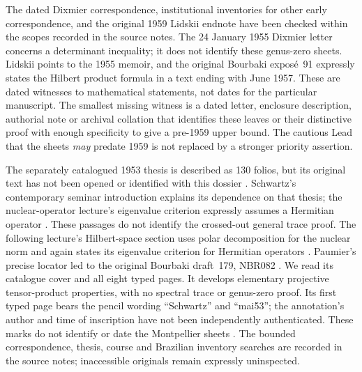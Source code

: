 The dated Dixmier correspondence, institutional inventories for other
early correspondence, and the original 1959 Lidskii endnote have
been checked within the scopes recorded in the source notes. The
24 January 1955 Dixmier letter concerns a determinant inequality;
it does not identify these genus-zero sheets. Lidskii points to the
1955 memoir, and the original Bourbaki expos\'e~91 expressly states
the Hilbert product formula in a text ending with June 1957. These
are dated witnesses to mathematical statements, not dates for the
particular manuscript. The smallest missing witness is a dated
letter, enclosure description, authorial note or archival collation
that identifies these leaves or their distinctive proof with enough
specificity to give a pre-1959 upper bound. The cautious Lead that
the sheets \emph{may} predate 1959 is not replaced by a stronger
priority assertion.

The separately catalogued 1953 thesis is described as 130 folios, but its
original text has not been opened or identified with this dossier
\cite{rootGrothendieckThesisCatalogue1953}. Schwartz's contemporary seminar
introduction explains its dependence on that thesis; the nuclear-operator
lecture's eigenvalue criterion expressly assumes a Hermitian operator
\cite[p.~III]{rootSchwartzSeminarIntroduction1954}
\cite[expos\'e~12, p.~3]{rootSchwartzNuclear1954}. These passages do not
identify the crossed-out general trace proof. The following lecture's
Hilbert-space section uses polar decomposition for the nuclear norm and
again states its eigenvalue criterion for Hermitian operators
\cite[expos\'e~13, \S3, pp.~3--5]{rootSchwartzNuclearCases1954}.
Paumier's precise locator led to the original Bourbaki draft~179,
NBR082 \cite[p.~64, note~73]{rootPaumierSchwartz2014}.
We read its catalogue cover and all eight typed pages. It develops
elementary projective tensor-product properties, with no spectral trace
or genus-zero proof. Its first typed page bears the pencil wording
``Schwartz'' and ``mai53''; the annotation's author and time of inscription
have not been independently authenticated. These marks do not identify
or date the Montpellier sheets \cite{catBourbaki179}. The bounded correspondence,
thesis, course and Brazilian inventory searches are recorded in the
source notes; inaccessible originals remain expressly uninspected.

